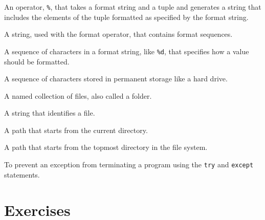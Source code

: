 \begin{vocabulary} An operator, {\tt \%}, that takes a format
string and a tuple and generates a string that includes
the elements of the tuple formatted as specified by the format string.
\end{vocabulary}
	
\begin{vocabulary} A string, used with the format operator, that
contains format sequences.  
\end{vocabulary}
	
\begin{vocabulary} A sequence of characters in a format string,
like {\tt \%d}, that specifies how a value should be formatted.
\end{vocabulary}
	
\begin{vocabulary} A sequence of characters stored in permanent
storage like a hard drive.
\end{vocabulary}
	
\begin{vocabulary}[directory:] A named collection of files, also called a folder.
\end{vocabulary}
	
\begin{vocabulary}[path:] A string that identifies a file.
\end{vocabulary}
	
\begin{vocabulary} A path that starts from the current directory.
\end{vocabulary}
	
\begin{vocabulary} A path that starts from the topmost directory
in the file system.
\end{vocabulary}
	
\begin{vocabulary}[catch:] To prevent an exception from terminating
a program using the {\tt try}
and {\tt except} statements.
\end{vocabulary}


\section{Exercises}
\label{sec:files-exercises}

